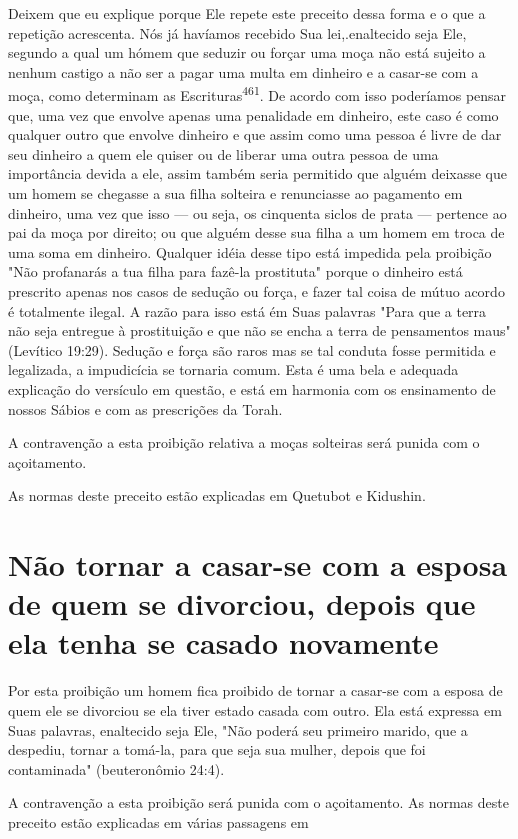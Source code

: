 Deixem que eu explique porque Ele repete este preceito dessa forma e o
que a repetição acrescenta. Nós já havíamos recebido Sua
lei,.enaltecido seja Ele, segundo a qual um hómem que
seduzir ou forçar uma moça não está sujeito a nenhum castigo a não ser a
pagar uma multa em dinheiro e a casar-se com a moça, como determinam as
Escrituras\textsuperscript{461}. De acordo com isso poderíamos pen­sar
que, uma vez que envolve apenas uma penalidade em dinheiro, este caso é
como qualquer outro que envolve dinheiro e que assim como uma pessoa é
livre de dar seu dinheiro a quem ele quiser ou de liberar uma outra
pessoa de uma importância devida a ele, assim também seria permitido que
alguém deixas­se que um homem se chegasse a sua filha solteira e
renunciasse ao pagamento em dinheiro, uma vez que isso --- ou seja, os
cinquenta siclos de prata --- perten­ce ao pai da moça por direito; ou
que alguém desse sua filha a um homem em troca de uma soma em dinheiro.
Qualquer idéia desse tipo está impedida pela proibição "Não profanarás a
tua filha para fazê-la prostituta" porque o dinheiro está prescrito
apenas nos casos de sedução ou força, e fazer tal coisa de mútuo acordo
é totalmente ilegal. A razão para isso está ém Suas palavras "Para que a
terra não seja entregue à prostituição e que não se encha a terra de
pensamentos maus" (Levítico 19:29). Sedução e força são raros mas se tal
conduta fosse per­mitida e legalizada, a impudicícia se tornaria comum.
Esta é uma bela e adequa­da explicação do versículo em questão, e está
em harmonia com os ensinamen­to de nossos Sábios e com as prescrições da
Torah.

A contravenção a esta proibição relativa a moças solteiras será puni­da
com o açoitamento.


As normas deste preceito estão explicadas em Quetubot e Kidushin.


\section{Não tornar a casar-se com a esposa de quem se divorciou,
depois que ela tenha se casado novamente}

Por esta proibição um homem fica proibido de tornar a casar-se com a
esposa de quem ele se divorciou se ela tiver estado casada com outro.
Ela está expressa em Suas palavras, enaltecido seja Ele, "Não poderá seu
primeiro marido, que a despediu, tornar a tomá-la, para que seja sua
mulher, depois que foi contaminada" (beuteronômio 24:4).

A contravenção a esta proibição será punida com o açoitamento. As normas
deste preceito estão explicadas em várias passagens em


